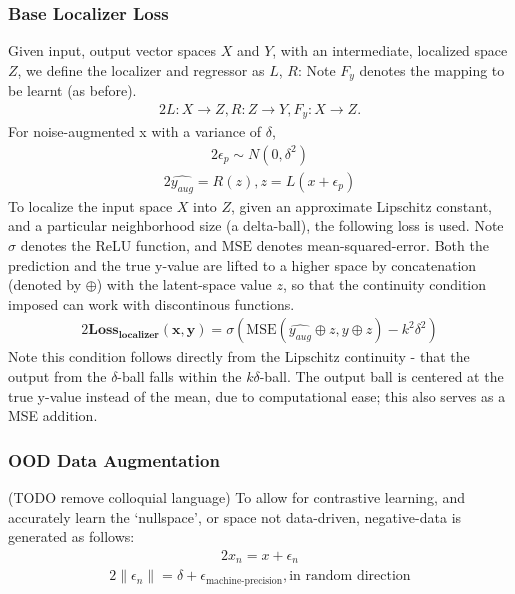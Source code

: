 \documentclass[12pt]{iopart}
\theoremstyle{break}
\begin{document}
\subsubsection{Base Localizer Loss}
Given input, output vector spaces $X$ and $Y$, with an intermediate, localized space $Z$, we define the localizer and regressor as $L$, $R$:
Note $F_y$ denotes the mapping to be learnt (as before).
\begin{alignat}{2}
L : X \rightarrow Z, R: Z \rightarrow Y, F_y : X \rightarrow Z.
\end{alignat}
For noise-augmented x with a variance of $\delta$, 
\begin{alignat}{2}
\epsilon_p \sim N(0,\delta^2)    
\end{alignat}
\begin{alignat}{2}
\hat{y_{aug}} = R(z), z = L(x + \epsilon_p)
\end{alignat}
To localize the input space $X$ into $Z$, given an approximate Lipschitz constant, and a particular neighborhood size (a delta-ball), the following loss is used.
Note $\sigma$ denotes the ReLU function, and $\text{MSE}$ denotes mean-squared-error.
Both the prediction and the true y-value are lifted to a higher space by concatenation (denoted by $\oplus$) with the latent-space value $z$, so that the continuity condition imposed can work with discontinous functions.
\begin{alignat}{2}
\mathbf{\text{Loss}_\text{localizer}(x,y)} = \sigma(\text{MSE}(\hat{y_{aug}} \oplus z,y \oplus z) - k^2 \delta^2)
\end{alignat}
Note this condition follows directly from the Lipschitz continuity - that the output from the $\delta$-ball falls within the $k\delta$-ball.
The output ball is centered at the true y-value instead of the mean, due to computational ease; this also serves as a MSE addition.
	
\subsubsection{OOD Data Augmentation}
(TODO remove colloquial language)
To allow for contrastive learning, and accurately learn the `nullspace', or space not data-driven, negative-data is generated as follows:
\begin{alignat}{2}
x_n = x + \epsilon_n
\end{alignat}
\begin{alignat}{2}
\|\epsilon_n\| = \delta + \epsilon_{\text{machine-precision}}, \text{in random direction}
\end{alignat}
	
\end{document}
